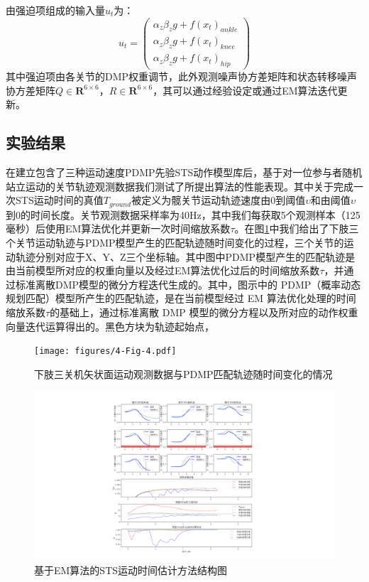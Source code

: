 由强迫项组成的输入量$u_t$为：
\begin{equation}
    u_t=\left(\begin{array}{l}
        \alpha_z \beta_z g+ f\left(x_t\right)_{ankle}\\
        \alpha_z \beta_z g+ f\left(x_t\right)_{knee}\\
        \alpha_z \beta_z g+ f\left(x_t\right)_{hip}
    \end{array}\right)
\end{equation}
其中强迫项由各关节的DMP权重调节，此外观测噪声协方差矩阵和状态转移噪声协方差矩阵$Q\in \mathbf{R}^{6 \times 6}$，$R\in \mathbf{R}^{6 \times 6}$，其可以通过经验设定或通过EM算法迭代更新\cite{bishopPatternRecognitionMachine2006}。

\subsection{实验结果} 
在建立包含了三种运动速度PDMP先验STS动作模型库后，基于对一位参与者随机站立运动的关节轨迹观测数据我们测试了所提出算法的性能表现。其中关于完成一次STS运动时间的真值$T_{ground}$被定义为髋关节运动轨迹速度由0到阈值$\upsilon $和由阈值$\upsilon$到0的时间长度。关节观测数据采样率为40Hz，其中我们每获取5个观测样本（125毫秒）后使用EM算法优化并更新一次时间缩放系数$\tau$。在图\ref{fig:4-4}中我们给出了下肢三个关节运动轨迹与PDMP模型产生的匹配轨迹随时间变化的过程，三个关节的运动轨迹分别对应于X、Y、Z三个坐标轴。其中图中PDMP模型产生的匹配轨迹是由当前模型所对应的权重向量以及经过EM算法优化过后的时间缩放系数$\tau$，并通过标准离散DMP模型的微分方程迭代生成的。其中，图示中的 PDMP（概率动态规划匹配）模型所产生的匹配轨迹，是在当前模型经过 EM 算法优化处理的时间缩放系数$\tau$的基础上，通过标准离散 DMP 模型的微分方程以及所对应的动作权重向量迭代运算得出的。黑色方块为轨迹起始点，

\begin{figure}
    \centering\texttt{[image: figures/4-Fig-4.pdf]}
    \caption{下肢三关机矢状面运动观测数据与PDMP匹配轨迹随时间变化的情况}
    \label{fig:4-4}
\end{figure}

\begin{figure}[!t]
    \centering\includegraphics[width=1\textwidth]{figures/4-Fig-5.pdf}
    \caption{基于EM算法的STS运动时间估计方法结构图}
    \label{fig:4-5}
\end{figure}

